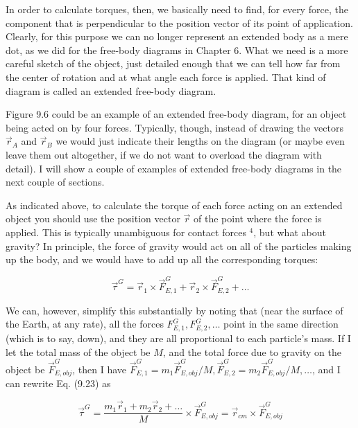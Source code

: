 \documentclass[10pt]{article}
\begin{document}
In order to calculate torques, then, we basically need to find, for every force, the component that is perpendicular to the position vector of its point of application. Clearly, for this purpose we can no longer represent an extended body as a mere dot, as we did for the free-body diagrams in Chapter 6. What we need is a more careful sketch of the object, just detailed enough that we can tell how far from the center of rotation and at what angle each force is applied. That kind of diagram is called an extended free-body diagram.

Figure 9.6 could be an example of an extended free-body diagram, for an object being acted on by four forces. Typically, though, instead of drawing the vectors $\vec{r}_{A}$ and $\vec{r}_{B}$ we would just indicate their lengths on the diagram (or maybe even leave them out altogether, if we do not want to overload the diagram with detail). I will show a couple of examples of extended free-body diagrams in the next couple of sections.

As indicated above, to calculate the torque of each force acting on an extended object you should use the position vector $\vec{r}$ of the point where the force is applied. This is typically unambiguous for contact forces ${ }^{4}$, but what about gravity? In principle, the force of gravity would act on all of the particles making up the body, and we would have to add up all the corresponding torques:


\begin{equation*}
\vec{\tau}^{G}=\vec{r}_{1} \times \vec{F}_{E, 1}^{G}+\vec{r}_{2} \times \vec{F}_{E, 2}^{G}+\ldots \tag{9.23}
\end{equation*}


We can, however, simplify this substantially by noting that (near the surface of the Earth, at any rate), all the forces $F_{E, 1}^{G}, F_{E, 2}^{G}, \ldots$ point in the same direction (which is to say, down), and they are all proportional to each particle's mass. If I let the total mass of the object be $M$, and the total force due to gravity on the object be $\vec{F}_{E, o b j}^{G}$, then I have $\vec{F}_{E, 1}^{G}=m_{1} \vec{F}_{E, o b j}^{G} / M, \vec{F}_{E, 2}^{G}=m_{2} \vec{F}_{E, o b j}^{G} / M, \ldots$, and I can rewrite Eq. (9.23) as


\begin{equation*}
\vec{\tau}^{G}=\frac{m_{1} \vec{r}_{1}+m_{2} \vec{r}_{2}+\ldots}{M} \times \vec{F}_{E, o b j}^{G}=\vec{r}_{c m} \times \vec{F}_{E, o b j}^{G} \tag{9.24}
\end{equation*}
\end{document}
